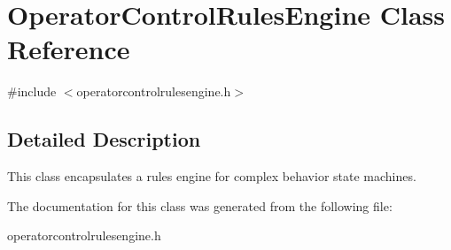 \hypertarget{classOperatorControlRulesEngine}{\section{Operator\-Control\-Rules\-Engine Class Reference}
\label{classOperatorControlRulesEngine}
}


{\ttfamily \#include $<$operatorcontrolrulesengine.\-h$>$}



\subsection{Detailed Description}
This class encapsulates a rules engine for complex behavior state machines. 

The documentation for this class was generated from the following file\-:\begin{DoxyCompactItemize}
\item 
operatorcontrolrulesengine.\-h\end{DoxyCompactItemize}
